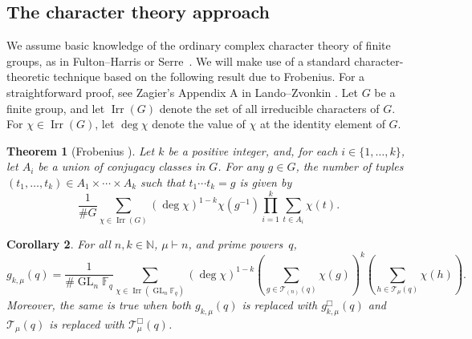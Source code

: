 \documentclass[10pt]{article}
\newtheorem{theorem}{Theorem}[section]
\newtheorem{corollary}[theorem]{Corollary}
\theoremstyle{definition}
\DeclareMathOperator{\GL}{GL}
\DeclareMathOperator{\Irr}{Irr}
\newcommand{\F}{\mathbb{F}}
\newcommand{\N}{\mathbb{N}}
\newcommand{\CT}{\mathcal{T}}
\begin{document}
\subsection{The character theory approach}
\label{approach}


We assume basic knowledge of the ordinary complex character theory of finite groups,
as in Fulton--Harris \cite{FH} or Serre~\cite{serre}.
We will make use of a standard character-theoretic technique based on the following result due to Frobenius.
For a straightforward proof, see Zagier's Appendix A in Lando--Zvonkin \cite{LZ}.
Let \(G\) be a finite group, and let \(\Irr (G)\) denote the set of all irreducible characters of \(G\).
For \(\chi \in \Irr (G)\), let \(\deg \chi\) denote the value of \(\chi\) at the identity element of \(G\).


\begin{theorem}[Frobenius \cite{frob}]\label{frob}
Let \(k\) be a positive integer, and, for each \(i \in \{1,\ldots,k\}\), let \(A_i\) be a union of conjugacy classes in \(G\).
For any \(g \in G\), the number of tuples \((t_1,\ldots,t_k) \in A_1 \times \cdots \times A_k\) such that \(t_1 \cdots t_k = g\) is given by
\begin{equation}
\frac{1}{\# G} \sum_{\chi \in \Irr (G)} (\deg \chi)^{1-k} \chi (g^{-1}) \prod_{i = 1}^k \sum_{t \in A_i} \chi(t).
\label{ff}
\end{equation}
\end{theorem}


\begin{corollary}
\label{ff_in_situ_corollary}
For all \(n,k \in \N\), \(\mu \vdash n\), and prime powers~\(q\),
\begin{equation}
g_{k,\mu} (q)
=
\label{ff_in_situ}
\frac{1}{\# \GL_n \F_q}
\sum_{\chi \in \Irr (\GL_n \F_q)}
(\deg \chi)^{1-k}
\left ( \sum_{g \in \CT_{(n)} (q)} \chi(g) \right )^k
\left ( \sum_{h \in \CT_\mu (q)}   \chi(h) \right ).
\end{equation}
Moreover, the same is true when both \(g_{k,\mu} (q)\) is replaced with \(g_{k,\mu}^\Box (q)\) and \(\CT_\mu (q)\) is replaced with \(\CT_\mu^\Box (q)\).
\end{corollary}
\end{document}
